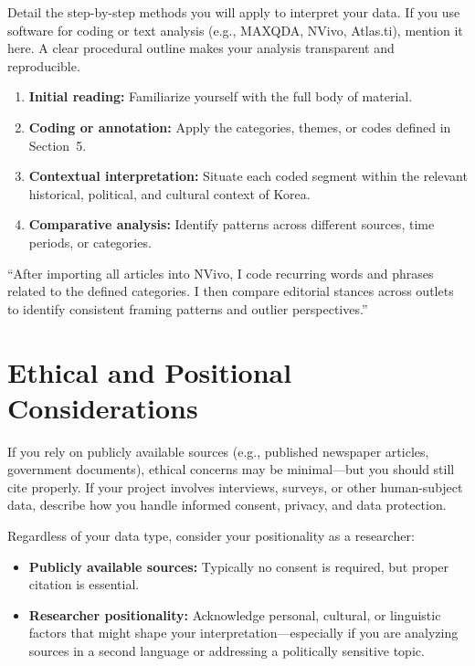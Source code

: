 \documentclass[11pt,a4paper]{article}
\begin{document}
Detail the step-by-step methods you will apply to interpret your data. If you use software for coding or text analysis (e.g., MAXQDA, NVivo, Atlas.ti), mention it here. A clear procedural outline makes your analysis transparent and reproducible.

\begin{enumerate}[nosep]
  \item \textbf{Initial reading:} Familiarize yourself with the full body of material.
  \item \textbf{Coding or annotation:} Apply the categories, themes, or codes defined in Section~5.
  \item \textbf{Contextual interpretation:} Situate each coded segment within the relevant historical, political, and cultural context of Korea.
  \item \textbf{Comparative analysis:} Identify patterns across different sources, time periods, or categories.
\end{enumerate}

\begin{examplebox}
``After importing all articles into NVivo, I code recurring words and phrases related to the defined categories. I then compare editorial stances across outlets to identify consistent framing patterns and outlier perspectives.''
\end{examplebox}

\section{Ethical and Positional Considerations}

If you rely on publicly available sources (e.g., published newspaper articles, government documents), ethical concerns may be minimal---but you should still cite properly. If your project involves interviews, surveys, or other human-subject data, describe how you handle informed consent, privacy, and data protection.

Regardless of your data type, consider your positionality as a researcher:

\begin{itemize}[nosep]
  \item \textbf{Publicly available sources:} Typically no consent is required, but proper citation is essential.
  \item \textbf{Researcher positionality:} Acknowledge personal, cultural, or linguistic factors that might shape your interpretation---especially if you are analyzing sources in a second language or addressing a politically sensitive topic.
\end{itemize}
\end{document}

